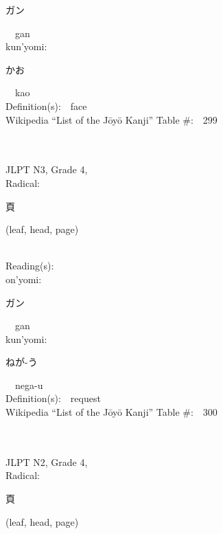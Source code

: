 \begin{multicols}{2}
{\hspace*{2em}}{\begin{CJK}{UTF8}{min} ガン \end{CJK}}\ \ gan\ \ \\
{\hspace*{1em}}kun'yomi:\ \ \\
{\hspace*{2em}}{\begin{CJK}{UTF8}{min} かお \end{CJK}}\ \ kao\ \ \\
Definition(s):\ \ face \\
Wikipedia ``List of the J\=oy\=o Kanji'' Table \#:\ \ 299 \\
\ \ \\
{\fontsize{34pt}{40pt}  }\ \ \\  %
{JLPT N3, Grade 4, \\Radical:\ \ {\begin{CJK}{UTF8}{min} 頁 \end{CJK}} (leaf, head, page) } \\
Reading(s):\ \ \\
{\hspace*{1em}}on'yomi:\ \ \\
{\hspace*{2em}}{\begin{CJK}{UTF8}{min} ガン \end{CJK}}\ \ gan\ \ \\
{\hspace*{1em}}kun'yomi:\ \ \\
{\hspace*{2em}}{\begin{CJK}{UTF8}{min} ねが-う \end{CJK}}\ \ nega-u\ \ \\
Definition(s):\ \ request \\
Wikipedia ``List of the J\=oy\=o Kanji'' Table \#:\ \ 300 \\
\ \ \\
{\fontsize{34pt}{40pt}  }\ \ \\  %
{JLPT N2, Grade 4, \\Radical:\ \ {\begin{CJK}{UTF8}{min} 頁 \end{CJK}} (leaf, head, page) } \\

\end{multicols}
